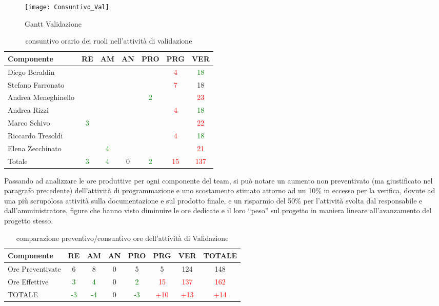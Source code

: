 \begin{figure}[h]
 \texttt{[image: Consuntivo\_Val]}
\caption{Gantt Validazione}\label{fig:ganttvalidazione}
\end{figure}

\begin{table}[h!]
\centering
\begin{tabular}{|l|c|c|c|c|c|c|}
\hline
Componente& RE& AM& AN& PRO& PRG& VER\\
\hline
Diego Beraldin & & & & & \textcolor{red}{4}& \textcolor{green}{18}\\
Stefano Farronato & & & & & \textcolor{red}{7}& 18\\
Andrea Meneghinello & & & & \textcolor{green}{2}& &\textcolor{red}{ 23}\\
Andrea Rizzi & & & & & \textcolor{red}{4}& \textcolor{green}{18}\\
Marco Schivo & \textcolor{green}{3}& & & & &\textcolor{red}{22}\\
Riccardo Tresoldi & & & & & \textcolor{red}{4}& \textcolor{green}{18}\\
Elena Zecchinato & & \textcolor{green}{4}& & & & \textcolor{red}{21}\\
\hline
Totale & \textcolor{green}{3}& \textcolor{green}{4}& 0& \textcolor{green}{2}& \textcolor{red}{15}& \textcolor{red}{137}\\
\hline
\end{tabular}
\caption{consuntivo orario dei ruoli nell'attività di validazione}\label{tab:consruolipdc}
\end{table}


Passando ad analizzare le ore produttive per ogni componente del team, si può notare un aumento non preventivato (ma giustificato nel paragrafo precedente) dell'attività di programmazione e uno scostamento stimato attorno ad un 10\% in eccesso per la verifica, dovute ad una più scrupolosa attività sulla documentazione e sul prodotto finale, e un risparmio del 50\% per l'attività svolta dal responsabile e dall'amministratore, figure che hanno visto diminuire le ore dedicate e il loro ``peso'' sul progetto in maniera lineare all'avanzamento del progetto stesso.

\begin{table}[H]
\centering
\begin{tabular}{|l|c c c c c c|c|}
\hline
Componente		& RE&   AM&   AN&  PRO& PRG& VER & TOTALE\\
\hline
Ore Preventivate	& 6&    8&   0&  5& 5&    124  & 148\\
Ore Effettive       	& \textcolor{green}{3} &   \textcolor{green}{4} &   0&  \textcolor{green}{2}& \textcolor{red}{15}&     \textcolor{red}{137} & \textcolor{red}{162}\\
\hline
TOTALE			& \textcolor{green}{-3}&    \textcolor{green}{-4}&    0&    \textcolor{green}{-3}&\textcolor{red}{+10}& \textcolor{red}{+13}& \textcolor{red}{+14}\\
\hline
\end{tabular}
\caption{comparazione preventivo/consuntivo ore dell'attività di Validazione}\label{tab:consoreval}
\end{table}


